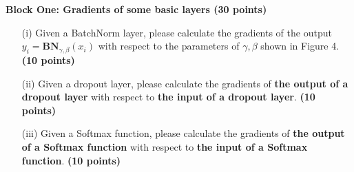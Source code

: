\textbf{Block One: Gradients of some basic layers (30 points)}
\begin{enumerate}
    \item[(i)] Given a BatchNorm layer, please calculate the gradients of the output 
    $y_i= \textbf{BN}_{\gamma,\beta}(x_i)$ with respect to the parameters of 
    $\gamma,\beta$ shown in Figure 4. \textbf{(10 points)}
    \item[(ii)] Given a dropout layer, please calculate the gradients of \textbf{the output 
    of a dropout layer} with respect to \textbf{the input of a dropout layer}. 
    \textbf{(10 points)}
    \item[(iii)] Given a Softmax function, please calculate the gradients of \textbf{the 
    output of a Softmax function} with respect to \textbf{the input of a Softmax 
    function}. \textbf{(10 points)}
\end{enumerate}